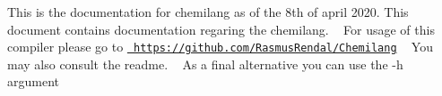 This is the documentation for chemilang as of the 8th of april 2020. This document contains documentation regaring the chemilang. ~\newline
For usage of this compiler please go to \href{https://github.com/RasmusRendal/Chemilang}{\texttt{ https\+://github.\+com/\+Rasmus\+Rendal/\+Chemilang}} ~\newline
You may also consult the readme. ~\newline
As a final alternative you can use the -\/h argument 